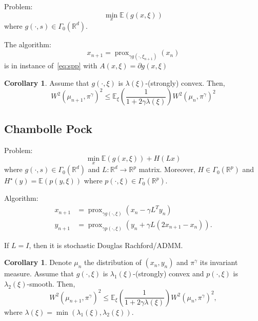 \documentclass{article}
\DeclareMathOperator{\prox}{prox}
\newcommand{\1}{\mathbbm 1}
\newcommand{\bE}{{{\mathbb E}}}
\newcommand{\bR}{{{\mathbb R}}}
\theoremstyle{definition}
\newtheorem{corollary}[theorem]{Corollary}
\begin{document}
Problem:
\begin{equation}
    \min_x \bE(g(x,\xi))
\end{equation}
where $g(\cdot,s) \in \Gamma_0(\bR^d)$.

The algorithm:
\begin{equation}
\label{eq:spg}
    x_{n+1} = \prox_{\gamma g(\cdot,\xi_{n+1})}(x_n)
\end{equation}
is in instance of~\eqref{eq:spp} with $A(x,\xi) = \partial g(x,\xi)$

\begin{corollary}
Assume that $g(\cdot,\xi)$ is $\lambda(\xi)$-(strongly) convex. Then,
\begin{equation}
    W^2(\mu_{n+1},\pi^\gamma)^2 \leq \bE_\xi\left(\frac{1}{1+2\gamma\lambda(\xi)}\right) W^2(\mu_{n},\pi^\gamma)^2
\end{equation}
\end{corollary}


\subsection{Chambolle Pock}

Problem:
\begin{equation}
    \min_x \bE(g(x,\xi)) + H(Lx)
\end{equation}
where $g(\cdot,s) \in \Gamma_0(\bR^d)$ and $L : \bR^d \to \bR^p$ matrix. Moreover, $H \in \Gamma_0(\bR^p)$ and $H^\star(y) = \bE(p(y,\xi))$ where $p(\cdot,\xi) \in \Gamma_0(\bR^p)$.

Algorithm:
\begin{align}
    x_{n+1} &= \prox_{\gamma g(\cdot,\xi)}(x_n - \gamma L^{T} y_n)\\
    y_{n+1} &= \prox_{\gamma p(\cdot,\xi)}(y_n + \gamma L (2 x_{n+1} - x_n)).
\end{align}

If $L = I$, then it is stochastic Douglas Rachford/ADMM.



\begin{corollary}
Denote $\mu_n$ the distribution of $(x_n,y_n)$ and $\pi^\gamma$ its invariant measure. Assume that $g(\cdot,\xi)$ is $\lambda_1(\xi)$-(strongly) convex and $p(\cdot,\xi)$ is $\lambda_2(\xi)$-smooth. Then,
\begin{equation}
    W^2(\mu_{n+1},\pi^\gamma)^2 \leq \bE_\xi\left(\frac{1}{1+2\gamma\lambda(\xi)}\right) W^2(\mu_{n},\pi^\gamma)^2,
\end{equation}
where $\lambda(\xi) = \min(\lambda_1(\xi),\lambda_2(\xi)).$
\end{corollary}
\end{document}
